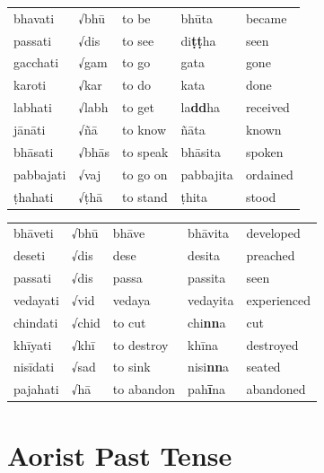 \documentclass[11pt,oneside]{memoir}
\begin{document}
\begin{widecols}


\begin{center}
\begin{tabular}{lllll}
bhavati & √bhū & to be & bhūta & became\\
passati & √dis & to see & di\textbf{ṭṭ}ha & seen\\
gacchati & √gam & to go & gata & gone\\
karoti & √kar & to do & kata & done\\
labhati & √labh & to get & la\textbf{dd}ha & received\\
jānāti & √ñā & to know & ñāta & known\\
bhāsati & √bhās & to speak & bhāsita & spoken\\
pabbajati & √vaj & to go on & pabbajita & ordained\\
ṭhahati & √ṭhā & to stand & ṭhita & stood\\
\end{tabular}
\end{center}

\columnbreak

\begin{center}
\begin{tabular}{lllll}
bhāveti & √bhū & bhāve & bhāvita & developed\\
deseti & √dis & dese & desita & preached\\
passati & √dis & passa & passita & seen\\
vedayati & √vid & vedaya & vedayita & experienced\\
chindati & √chid & to cut & chi\textbf{nn}a & cut\\
khīyati & √khī & to destroy & khīna & destroyed\\
nisīdati & √sad & to sink & nisi\textbf{nn}a & seated\\
pajahati & √hā & to abandon & pah\textbf{ī}na & abandoned\\
\end{tabular}
\end{center}
\end{widecols}

\clearpage
\section{Aorist Past Tense}
\label{sec:orgf606051}
\end{document}
